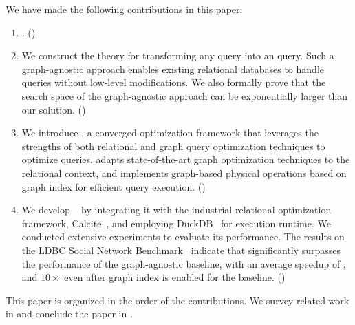 We have made the following contributions in this paper:
\begin{enumerate}
\item {}. \hfill()

\item We construct the theory for transforming any \spjm query into an \spj query. Such a graph-agnostic approach enables existing relational databases to handle \spjm queries without low-level modifications. We also formally prove that the search space
of the graph-agnostic approach can be exponentially larger than our solution. \hfill()

\item We introduce \name, a converged optimization framework that leverages the strengths of both relational and graph query optimization techniques to optimize \spjm queries. \name adapts state-of-the-art graph optimization techniques to the relational context, and implements graph-based physical operations based on graph index for efficient query execution. \hfill()

\item We develop \name~ by integrating it with the industrial relational optimization framework, Calcite~\cite{calcite}, and employing DuckDB~\cite{duckdb} for execution runtime. We conducted extensive experiments to evaluate its performance. The results on the LDBC Social Network Benchmark~\cite{ldbc_snb} indicate that \name significantly surpasses the performance of the graph-agnostic baseline, with an average speedup of \revise{$21.9\times$}, and $10\times$ even after graph index is enabled for the baseline. \hfill()

\end{enumerate}

This paper is organized in the order of the contributions. We survey related work in 
and conclude the paper in .

